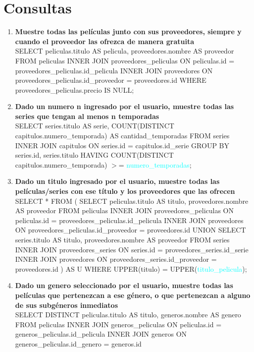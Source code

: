 \documentclass{article}
\begin{document}
\section{Consultas}
\begin{enumerate}
    \item \textbf{Muestre todas las películas junto con sus proveedores, siempre y cuando el proveedor las ofrezca de manera gratuita} \\
    SELECT peliculas.titulo AS pelicula, proveedores.nombre AS proveedor FROM peliculas
    INNER JOIN proveedores\_peliculas ON peliculas.id = proveedores\_peliculas.id\_pelicula
    INNER JOIN proveedores ON proveedores\_peliculas.id\_proveedor = proveedores.id
    WHERE proveedores\_peliculas.precio IS NULL;
    \item \textbf{Dado un numero n ingresado por el usuario, muestre todas las series que tengan al menos n temporadas} \\
    SELECT series.titulo AS serie, COUNT(DISTINCT capitulos.numero\_temporada) AS cantidad\_temporadas FROM series
    INNER JOIN capitulos ON series.id = capitulos.id\_serie
    GROUP BY series.id, series.titulo
    HAVING COUNT(DISTINCT capitulos.numero\_temporada) $>$= \textcolor{cyan}{numero\_temporadas};
    \item \textbf{Dado un titulo ingresado por el usuario, muestre todas las películas/series con ese título y los proveedores que las ofrecen} \\
    SELECT * FROM (
        SELECT peliculas.titulo AS titulo, proveedores.nombre AS proveedor FROM peliculas
        INNER JOIN proveedores\_peliculas ON peliculas.id = proveedores\_peliculas.id\_pelicula
        INNER JOIN proveedores ON proveedores\_peliculas.id\_proveedor = proveedores.id
        UNION
        SELECT series.titulo AS titulo, proveedores.nombre AS proveedor FROM series
        INNER JOIN proveedores\_series ON series.id = proveedores\_series.id\_serie
        INNER JOIN proveedores ON proveedores\_series.id\_proveedor = proveedores.id
    ) AS U WHERE UPPER(titulo) = UPPER(\textcolor{cyan}{titulo\_pelicula});
    \item \textbf{Dado un genero seleccionado por el usuario, muestre todas las películas que pertenezcan a ese género, o que pertenezcan a alguno de sus subgéneros inmediatos} \\
    SELECT DISTINCT peliculas.titulo AS titulo, generos.nombre AS genero FROM peliculas
    INNER JOIN generos\_peliculas ON peliculas.id = generos\_peliculas.id\_pelicula
    INNER JOIN generos ON generos\_peliculas.id\_genero = generos.id

\end{enumerate}
\end{document}
